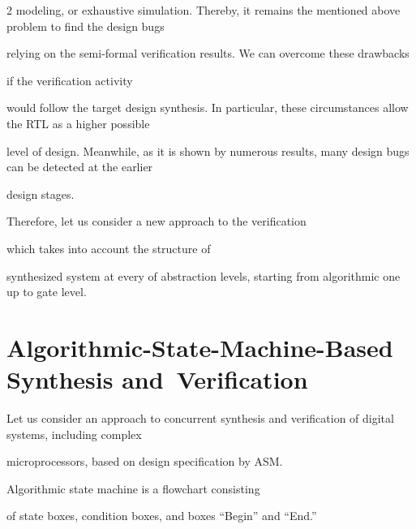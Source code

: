 \begin{multicols}{2}
modeling, or exhaustive simulation. Thereby, it remains the mentioned above problem to find the design bugs


relying on the semi-formal verification results. We can overcome these drawbacks


if the verification activity


would follow the target design synthesis. In particular, these circumstances allow the RTL as a higher possible


level of design. Meanwhile, as it is shown by numerous results, many design bugs can be detected at the earlier


design stages.





Therefore, let us consider a new approach to the verification


which takes into account the structure of


synthesized system at every of abstraction levels, starting from algorithmic one up to gate level.





\vspace*{-6pt}





\section{Algorithmic-State-Machine-Based Synthesis and~Verification} %





    \noindent


Let us consider an approach to concurrent synthesis and verification of digital systems, including complex


microprocessors, based on design specification by ASM.





Algorithmic state machine is a flowchart consisting


of state boxes, condition boxes, and boxes ``Begin'' and ``End.''





\medskip








\end{multicols}
